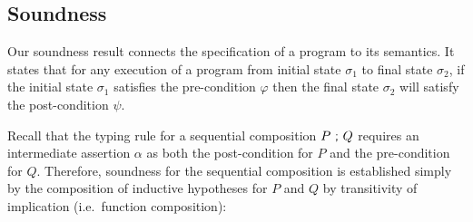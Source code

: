 \documentclass[sigplan]{acmart}%
\begin{document}
\subsection{Soundness}\label{subsec:soundness}
Our soundness result connects the specification of a program to its semantics.
It states that for any execution of a program 
\AgdaSpace{}%
\AgdaSymbol{:}\AgdaSpace{}%
\AgdaOperator{\AgdaDatatype{[}}\AgdaSpace{}%
\AgdaSpace{}%
\AgdaOperator{\AgdaDatatype{,}}\AgdaSpace{}%
\AgdaSpace{}%
\AgdaOperator{\AgdaDatatype{]}}
from initial state $\sigma_1$ to 
final state $\sigma_2$, if the initial state $\sigma_1$ satisfies the pre-condition $\varphi$
then the final state $\sigma_2$ will satisfy the post-condition $\psi$.
\begin{code}
\>[2]%
\>[552I]\AgdaSymbol{:}\AgdaSpace{}%
\AgdaSymbol{(}\AgdaSpace{}%
\AgdaSymbol{:}\AgdaSpace{}%
\AgdaOperator{\AgdaDatatype{[}}\AgdaSpace{}%
\AgdaSpace{}%
\AgdaOperator{\AgdaDatatype{,}}\AgdaSpace{}%
\AgdaSpace{}%
\AgdaOperator{\AgdaDatatype{]}}\AgdaSymbol{)}\<%
\>[8]\AgdaSpace{}%
\AgdaSpace{}%
\AgdaSpace{}%
\AgdaSpace{}%
\AgdaSpace{}%
\AgdaSpace{}%
\AgdaSpace{}%
%
\>[27]\AgdaSpace{}\!%
\AgdaSpace{}\!%
\AgdaSpace{}%
\AgdaSpace{}%
\AgdaSpace{}%
\AgdaSpace{}\!%
\AgdaSpace{}\!%
\<%
\end{code}
Recall that the typing rule for a sequential composition $P\ \AgdaFunction{;}\ Q$ requires an intermediate assertion $\alpha$ 
as both the post-condition for $P$ and the pre-condition for $Q$. Therefore, soundness for the sequential composition is established 
simply by the composition of inductive hypotheses for $P$ and $Q$ by transitivity of implication (i.e.\ function composition): 
\begin{code}
\>[2]\AgdaSpace{}%
\AgdaSymbol{(}\AgdaSpace{}%
\AgdaSpace{}%
\AgdaSymbol{)}\AgdaSpace{}%
\AgdaSymbol{(\AgdaUnderscore{}}\AgdaSpace{}%
\AgdaOperator{\AgdaInductiveConstructor{,}}\AgdaSpace{}%
\AgdaSpace{}%
\AgdaOperator{\AgdaInductiveConstructor{,}}\AgdaSpace{}%
\AgdaSymbol{)}\AgdaSpace{}%
\>[30]\AgdaSymbol{=}\AgdaSpace{}%
\AgdaSpace{}%
\AgdaSpace{}%
\AgdaSpace{}%
\AgdaSpace{}%
\AgdaSpace{}%
\AgdaSpace{}%
\<%
\end{code}
\end{document}
